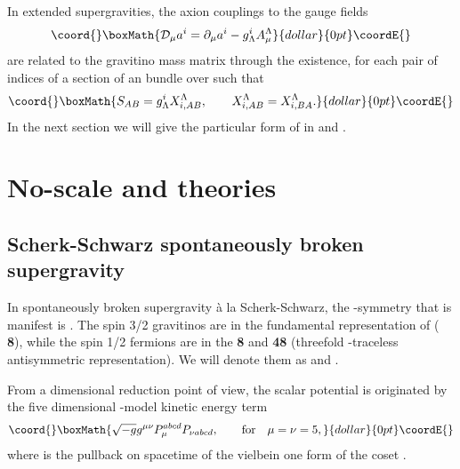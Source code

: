 \documentclass[a4paper,12pt]{article}
\begin{document}
 In \coordHE{} extended supergravities, the axion couplings  to the gauge fields
 $$\coord{}\boxMath{\mathcal{D}_\mu a^i=\partial_\mu a^i-g_\Lambda^iA_\mu^\Lambda}{dollar}{0pt}\coordE{}$$
 are related to the gravitino mass matrix \coordHE{} through the existence, for each pair of indices
\coordHE{} of a section \coordHE{} of an \coordHE{} bundle over \coordHE{} such that
 $$\coord{}\boxMath{S_{AB}=g_\Lambda^iX_{i,AB}^\Lambda, \qquad X_{i,AB}^\Lambda=X_{i,BA}^\Lambda.}{dollar}{0pt}\coordE{}$$
 In the next section we will give the particular form of \coordHE{} in \coordHE{} and \coordHE{}.

 \section{No-scale \coordHE{} and \coordHE{} theories}

 \subsection{\coordHE{} Scherk-Schwarz spontaneously broken supergravity}

 In \coordHE{} spontaneously broken supergravity \`a la Scherk-Schwarz, the \coordHE{}-symmetry that is manifest
is
\coordHE{}. The spin 3/2 gravitinos are in the fundamental representation of \coordHE{}
({\bf
8}), while the spin 1/2 fermions are in the {\bf 8} and {\bf 48} (threefold \myHighlight{$\Omega$}\coordHE{}-traceless
antisymmetric representation). We will denote them as \coordHE{} and \coordHE{}.

 From a dimensional reduction point of view, the scalar potential is originated by the five
dimensional
\myHighlight{$\sigma$}\coordHE{}-model kinetic energy term
 $$\coord{}\boxMath{\sqrt{-g}g^{\mu\nu}P_\mu^{abcd}P_{\nu abcd},\qquad \mathrm{for} \quad\mu=\nu=5, }{dollar}{0pt}\coordE{}$$
 where \coordHE{} is the pullback on spacetime of the  vielbein one form of the coset
\coordHE{}.
\end{document}
